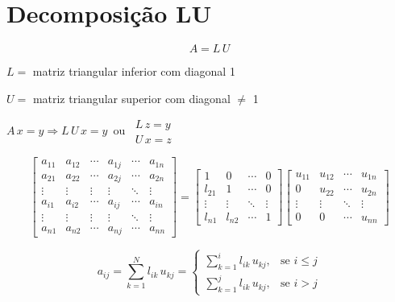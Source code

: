 \section{Decomposição LU}

\[ A = L \, U \]

$L =$ matriz triangular inferior com diagonal 1

$U =$ matriz triangular superior com diagonal $\neq$ 1

\begin{center}
$ A \, x = y \Rightarrow L \, U \, x = y \,$
 ou
$
  \,
  \begin{array}{l}
    L \, z = y\\
    U \, x = z
  \end{array}
$
\end{center}

\[
 \left[
  \begin{array}{cccccc}
   a_{11} & a_{12} & \cdots & a_{1j} & \cdots & a_{1n} \\
   a_{21} & a_{22} & \cdots & a_{2j} & \cdots & a_{2n} \\
   \vdots & \vdots & \vdots & \vdots & \ddots & \vdots \\
   a_{i1} & a_{i2} & \cdots & a_{ij} & \cdots & a_{in} \\
   \vdots & \vdots & \vdots & \vdots & \ddots & \vdots \\
   a_{n1} & a_{n2} & \cdots & a_{nj} & \cdots & a_{nn}
  \end{array}
 \right]
 =
 \left[
  \begin{array}{cccc}
   1 & 0 & \cdots & 0 \\
   l_{21} & 1 & \cdots & 0 \\
   \vdots & \vdots & \ddots & \vdots \\
   l_{n1} & l_{n2} & \cdots & 1
  \end{array}
 \right]
 \left[
  \begin{array}{cccc}
   u_{11} & u_{12} & \cdots & u_{1n} \\
   0 & u_{22} & \cdots & u_{2n} \\
   \vdots & \vdots & \ddots & \vdots \\
   0 & 0 & \cdots & u_{nn}
  \end{array}
 \right]
\]

\[
a_{ij} = \sum_{k = 1}^{N}l_{ik} \, u_{kj}
=
 \left\{
  \begin{array}{ll}
   \displaystyle \sum_{k = 1}^{i}l_{ik} \, u_{kj}, & \mbox{se $i \leq j$}\\
   \displaystyle \sum_{k = 1}^{j}l_{ik} \, u_{kj}, & \mbox{se $i > j$}
  \end{array}
 \right.
\]

